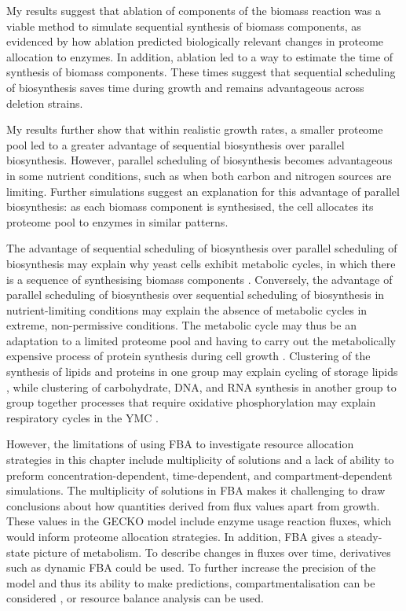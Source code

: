 My results suggest that ablation of components of the biomass reaction was a viable method to simulate sequential synthesis of biomass components, as evidenced by how ablation predicted biologically relevant changes in proteome allocation to enzymes.
In addition, ablation led to a way to estimate the time of synthesis of biomass components.
These times suggest that sequential scheduling of biosynthesis saves time during growth and remains advantageous across deletion strains.

My results further show that within realistic growth rates, a smaller proteome pool led to a greater advantage of sequential biosynthesis over parallel biosynthesis.
However, parallel scheduling of biosynthesis becomes advantageous in some nutrient conditions, such as when both carbon and nitrogen sources are limiting.
Further simulations suggest an explanation for this advantage of parallel biosynthesis: as each biomass component is synthesised, the cell allocates its proteome pool to enzymes in similar patterns.

The advantage of sequential scheduling of biosynthesis over parallel scheduling of biosynthesis may explain why yeast cells exhibit metabolic cycles, in which there is a sequence of synthesising biomass components \parencite{mellorMolecularBasisMetabolic2016}.
Conversely, the advantage of parallel scheduling of biosynthesis over sequential scheduling of biosynthesis in nutrient-limiting conditions may explain the absence of metabolic cycles in extreme, non-permissive conditions.
The metabolic cycle may thus be an adaptation to a limited proteome pool and having to carry out the metabolically expensive process of protein synthesis during cell growth \parencite{oneillEukaryoticCellBiology2020}.
Clustering of the synthesis of lipids and proteins in one group may explain cycling of storage lipids \parencite{campbellBuildingBlocksAre2020}, while clustering of carbohydrate, DNA, and RNA synthesis in another group to group together processes that require oxidative phosphorylation may explain respiratory cycles in the YMC \parencite{tuLogicYeastMetabolic2005}.

However, the limitations of using FBA to investigate resource allocation strategies in this chapter include multiplicity of solutions and a lack of ability to preform concentration-dependent, time-dependent, and compartment-dependent simulations.
The multiplicity of solutions in FBA makes it challenging to draw conclusions about how quantities derived from flux values apart from growth.
These values in the GECKO model include enzyme usage reaction fluxes, which would inform proteome allocation strategies.
In addition, FBA gives a steady-state picture of metabolism.
To describe changes in fluxes over time, derivatives such as dynamic FBA \parencite{mahadevanDynamicFluxBalance2002} could be used.
To further increase the precision of the model and thus its ability to make predictions, compartmentalisation can be considered \parencite{elsemmanWholecellModelingYeast2022}, or resource balance analysis \parencite{goelzerCellDesignBacteria2011} can be used.
